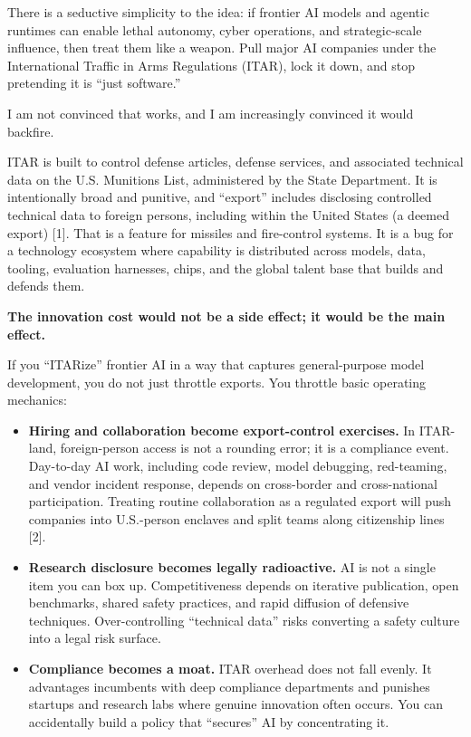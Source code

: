 \documentclass[11pt]{article}
\begin{document}
\MemoRenderHeader

There is a seductive simplicity to the idea: if frontier AI models and
agentic runtimes can enable lethal autonomy, cyber operations, and
strategic-scale influence, then treat them like a weapon. Pull major AI
companies under the International Traffic in Arms Regulations (ITAR),
lock it down, and stop pretending it is ``just software.''

I am not convinced that works, and I am increasingly convinced it would
backfire.

ITAR is built to control defense articles, defense services, and
associated technical data on the U.S. Munitions List, administered by
the State Department. It is intentionally broad and punitive, and
``export'' includes disclosing controlled technical data to foreign
persons, including within the United States (a deemed export) {[}1{]}.
That is a feature for missiles and fire-control systems. It is a bug for
a technology ecosystem where capability is distributed across models,
data, tooling, evaluation harnesses, chips, and the global talent base
that builds and defends them.

\textbf{The innovation cost would not be a side effect; it would be the
main effect.}

If you ``ITARize'' frontier AI in a way that captures general-purpose
model development, you do not just throttle exports. You throttle basic
operating mechanics:

\begin{itemize}
\tightlist
\item
  \textbf{Hiring and collaboration become export-control exercises.} In
  ITAR-land, foreign-person access is not a rounding error; it is a
  compliance event. Day-to-day AI work, including code review, model
  debugging, red-teaming, and vendor incident response, depends on
  cross-border and cross-national participation. Treating routine
  collaboration as a regulated export will push companies into
  U.S.-person enclaves and split teams along citizenship lines {[}2{]}.
\item
  \textbf{Research disclosure becomes legally radioactive.} AI is not a
  single item you can box up. Competitiveness depends on iterative
  publication, open benchmarks, shared safety practices, and rapid
  diffusion of defensive techniques. Over-controlling ``technical data''
  risks converting a safety culture into a legal risk surface.
\item
  \textbf{Compliance becomes a moat.} ITAR overhead does not fall
  evenly. It advantages incumbents with deep compliance departments and
  punishes startups and research labs where genuine innovation often
  occurs. You can accidentally build a policy that ``secures'' AI by
  concentrating it.
\end{itemize}
\end{document}
